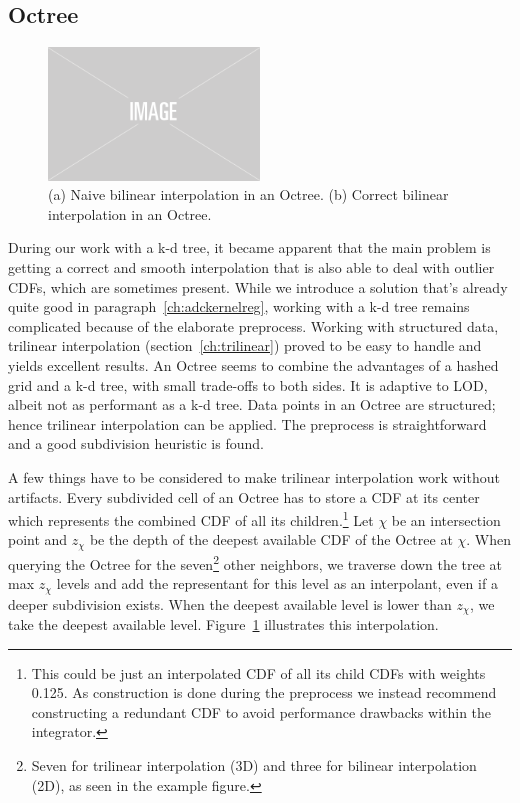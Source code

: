 \subsection{Octree}
\label{ch:octree}

\begin{figure}
    \centering
    \includegraphics[width=0.5\textwidth]{figures/img-placeholder.png}
    \caption{(a) Naive bilinear interpolation in an Octree. (b) Correct bilinear interpolation in an Octree.}
    \label{fig:trilinearoctree}
\end{figure}

During our work with a k-d tree, it became apparent that the main problem is getting a correct and smooth interpolation that is also able to deal with outlier CDFs, which are sometimes present. While we introduce a solution that's already quite good in paragraph~\ref{ch:adckernelreg}, working with a k-d tree remains complicated because of the elaborate preprocess. Working with structured data, trilinear interpolation (section~\ref{ch:trilinear}) proved to be easy to handle and yields excellent results. An Octree seems to combine the advantages of a hashed grid and a k-d tree, with small trade-offs to both sides. It is adaptive to LOD, albeit not as performant as a k-d tree. Data points in an Octree are structured; hence trilinear interpolation can be applied. The preprocess is straightforward and a good subdivision heuristic is found.

A few things have to be considered to make trilinear interpolation work without artifacts. Every subdivided cell of an Octree has to store a CDF at its center which represents the combined CDF of all its children.\footnote{This could be just an interpolated CDF of all its child CDFs with weights 0.125. As construction is done during the preprocess we instead recommend constructing a redundant CDF to avoid performance drawbacks within the integrator.} Let $\chi$ be an intersection point and $z_\chi$ be the depth of the deepest available CDF of the Octree at $\chi$. When querying the Octree for the seven\footnote{Seven for trilinear interpolation (3D) and three for bilinear interpolation (2D), as seen in the example figure.} other neighbors, we traverse down the tree at max $z_\chi$ levels and add the representant for this level as an interpolant, even if a deeper subdivision exists. When the deepest available level is lower than $z_\chi$, we take the deepest available level. Figure~\ref{fig:trilinearoctree} illustrates this interpolation.


